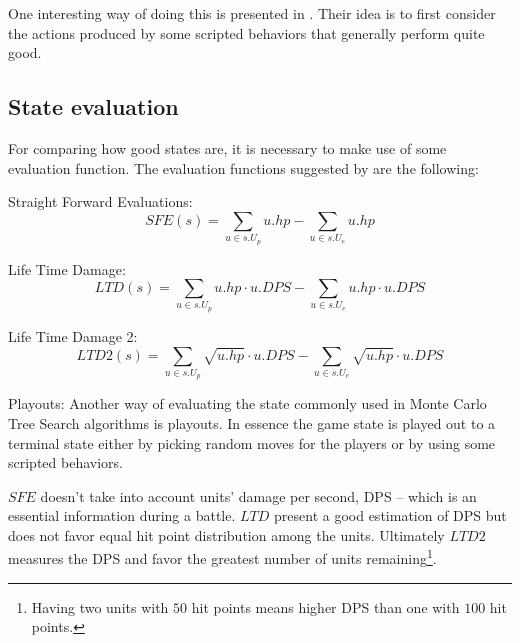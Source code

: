 One interesting way of doing this is presented in \cite{portfolio}.
Their idea is to first consider the actions produced by some scripted behaviors that generally perform quite good.



\subsection{State evaluation}
For comparing how good states are, it is necessary to make use of some evaluation function.
The evaluation functions suggested by \cite{abcd} are the following:
\begin{shortitem}
\item Straight Forward Evaluations:
$$
    \displaystyle{SFE(s) = \sum_{u \in s.U_p} u.hp - \sum_{u \in s.U_e} u.hp } 
$$

\item Life Time Damage:
$$
    \displaystyle{LTD(s) = \sum_{u \in s.U_p} u.hp \cdot u.DPS- \sum_{u \in s.U_e} u.hp \cdot u.DPS } 
$$

\item Life Time Damage 2:
$$
    \displaystyle{LTD2(s) = \sum_{u \in s.U_p} \sqrt{u.hp} \cdot u.DPS - \sum_{u \in s.U_e} \sqrt{u.hp} \cdot u.DPS } 
$$

\item Playouts:
	Another way of evaluating the state commonly used in Monte Carlo Tree Search algorithms is playouts. In essence the game state is played out to a terminal state either by picking random moves for the players or by using some scripted behaviors.
\end{shortitem}


$SFE$ doesn't take into account units' damage per second, DPS -- which is an essential information during a battle. 
$LTD$ present a good estimation of DPS but does not favor equal hit point distribution among the units. 
Ultimately $LTD2$ measures the DPS and favor the greatest number of units remaining\footnote{Having two units with $50$ hit points means higher DPS than one with $100$ hit points.}.




